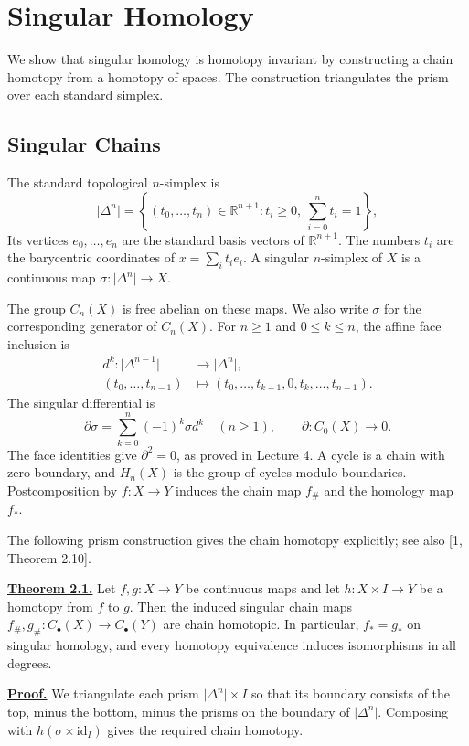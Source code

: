 \documentclass[11pt]{article}
\newcounter{result}[section]
\newcommand{\coursebold}[1]{{\color{burgundy}\textbf{#1}}}
\newcommand{\facehead}[1]{\subsection{#1}}
\begin{document}
\section{Singular Homology}\label{sec:singular-homology}
We show that singular homology is homotopy invariant by constructing a chain homotopy from a homotopy of spaces. The construction triangulates the prism over each standard simplex.

\facehead{Singular Chains}
The standard topological $n$-simplex is
\[
\lvert\Delta^n\rvert
=\left\{(t_0,\ldots,t_n)\in\mathbb R^{n+1}:t_i\ge0,\ \sum_{i=0}^nt_i=1\right\},
\]
Its vertices $e_0,\ldots,e_n$ are the standard basis vectors of $\mathbb R^{n+1}$.
The numbers $t_i$ are the barycentric coordinates of $x=\sum_i t_ie_i$.
A singular $n$-simplex of $X$ is a continuous map $\sigma:\lvert\Delta^n\rvert\to X$.

The group $C_n(X)$ is free abelian on these maps. We also write $\sigma$ for the corresponding generator of $C_n(X)$.
For $n\ge1$ and $0\le k\le n$, the affine face inclusion is
\[
\begin{aligned}
d^k:\lvert\Delta^{n-1}\rvert&\longrightarrow\lvert\Delta^n\rvert,\\
(t_0,\ldots,t_{n-1})&\longmapsto(t_0,\ldots,t_{k-1},0,t_k,\ldots,t_{n-1}).
\end{aligned}
\]
The singular differential is
\[
\partial\sigma=\sum_{k=0}^n(-1)^k\sigma d^k\quad(n\ge1),
\qquad \partial:C_0(X)\longrightarrow0.
\]
The face identities give $\partial^2=0$, as proved in Lecture 4. A cycle is a chain with zero boundary, and $H_n(X)$ is the group of cycles modulo boundaries. Postcomposition by $f:X\to Y$ induces the chain map $f_\#$ and the homology map $f_*$.

The following prism construction gives the chain homotopy explicitly; see also [1, Theorem 2.10].

\label{sec:result}\hypertarget{thm12}{}\coursebold{\hyperlink{proof12}{Theorem 2.1.}} Let $f,g:X\to Y$ be continuous maps and let $h:X\times I\to Y$ be a homotopy from $f$ to $g$. Then the induced singular chain maps $f_\#,g_\#:C_\bullet(X)\to C_\bullet(Y)$ are chain homotopic. In particular, $f_*=g_*$ on singular homology, and every homotopy equivalence induces isomorphisms in all degrees.

\label{sec:details}\hypertarget{proof12}{}\coursebold{\hyperlink{thm12}{Proof.}} We triangulate each prism $\lvert\Delta^n\rvert\times I$ so that its boundary consists of the top, minus the bottom, minus the prisms on the boundary of $\lvert\Delta^n\rvert$. Composing with $h(\sigma\times\mathrm{id}_I)$ gives the required chain homotopy.
\end{document}
